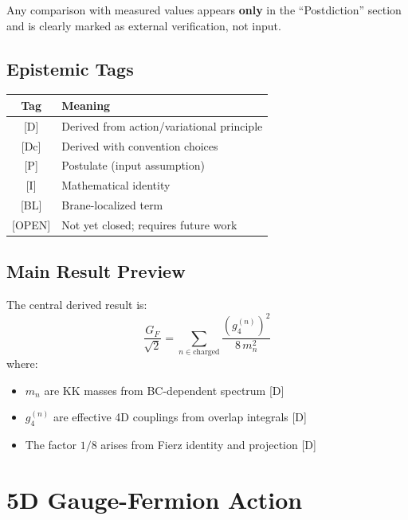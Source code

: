 \documentclass[11pt,a4paper]{article}
\begin{document}
Any comparison with measured values appears \textbf{only} in the ``Postdiction''
section and is clearly marked as external verification, not input.

\subsection{Epistemic Tags}

\begin{center}
\begin{tabular}{cl}
\toprule
Tag & Meaning \\
\midrule
{[D]} & Derived from action/variational principle \\
{[Dc]} & Derived with convention choices \\
{[P]} & Postulate (input assumption) \\
{[I]} & Mathematical identity \\
{[BL]} & Brane-localized term \\
{[OPEN]} & Not yet closed; requires future work \\
\bottomrule
\end{tabular}
\end{center}

\subsection{Main Result Preview}

The central derived result is:
\begin{equation}
\boxed{
\frac{G_F}{\sqrt{2}} = \sum_{n \in \text{charged}} \frac{(g_4^{(n)})^2}{8\, m_n^2}
}
\label{eq:main-result-preview}
\end{equation}
where:
\begin{itemize}
\item $m_n$ are KK masses from BC-dependent spectrum [D]
\item $g_4^{(n)}$ are effective 4D couplings from overlap integrals [D]
\item The factor $1/8$ arises from Fierz identity and projection [D]
\end{itemize}

\section{5D Gauge-Fermion Action}
\label{sec:5d-action}
\end{document}

